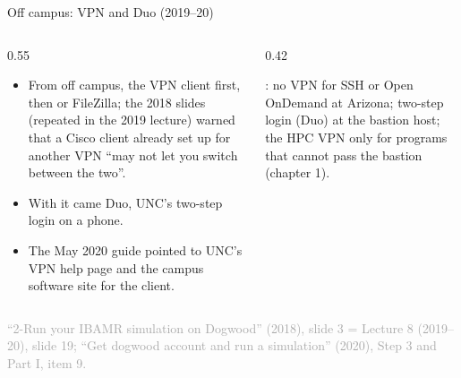 \documentclass[aspectratio=169,11pt]{beamer}
\newcommand{\sourcecredit}[1]{\vfill\begin{flushright}\tiny\textcolor{DarkGray}{#1}\end{flushright}}
\begin{document}
\begin{frame}{Off campus: VPN and Duo (2019--20)}
\label{fr:dwvpn}
\begin{columns}[T,onlytextwidth]
\begin{column}{0.55\textwidth}
\small
\begin{itemize}\setlength{\itemsep}{3pt}
  \item From off campus, the VPN client first, then  or FileZilla; the 2018 slides (repeated in the 2019 lecture) warned that a Cisco client already set up for another VPN ``may not let you switch between the two''.
  \item With it came Duo, UNC's two-step login on a phone.
  \item The May 2020 guide pointed to UNC's VPN help page and the campus software site for the client.
\end{itemize}
\end{column}
\begin{column}{0.42\textwidth}
\begin{punchbox}
\small {}: no VPN for SSH or Open OnDemand at Arizona; two-step login (Duo) at the bastion host; the HPC VPN only for programs that cannot pass the bastion (chapter 1).
\end{punchbox}
\end{column}
\end{columns}
\sourcecredit{``2-Run your IBAMR simulation on Dogwood'' (2018), slide 3 = Lecture 8 (2019--20), slide 19; ``Get dogwood account and run a simulation'' (2020), Step 3 and Part I, item 9.}
\end{frame}
\end{document}
